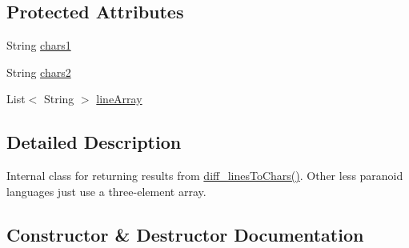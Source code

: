 \subsection*{Protected Attributes}
\begin{DoxyCompactItemize}
\item 
String \hyperlink{classorg_1_1buildmlearn_1_1toolkit_1_1utilities_1_1diff__match__patch_1_1LinesToCharsResult_a47581ab7cb34bdc7b35c15ee5279aa34}{chars1}
\item 
String \hyperlink{classorg_1_1buildmlearn_1_1toolkit_1_1utilities_1_1diff__match__patch_1_1LinesToCharsResult_ac31f129e1fd73832de11bcc65a49c322}{chars2}
\item 
List$<$ String $>$ \hyperlink{classorg_1_1buildmlearn_1_1toolkit_1_1utilities_1_1diff__match__patch_1_1LinesToCharsResult_aa2d7f5289bb2dfc874779ac2f48c0e82}{line\+Array}
\end{DoxyCompactItemize}


\subsection{Detailed Description}
Internal class for returning results from \hyperlink{classorg_1_1buildmlearn_1_1toolkit_1_1utilities_1_1diff__match__patch_a3a517130c3822a26a829ecd454518e98}{diff\+\_\+lines\+To\+Chars()}. Other less paranoid languages just use a three-\/element array. 

\subsection{Constructor \& Destructor Documentation}
